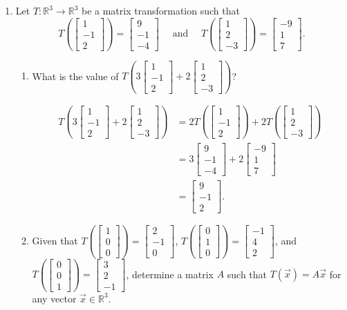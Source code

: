 \documentclass[12pt]{article}
\newcommand{\points}[1]{\marginpar{\hspace{24pt}[#1]}}
\newcommand{\R}{\mathbb{R}}
\newcommand{\bbm}{\begin{bmatrix}}
\newcommand{\ebm}{\end{bmatrix}}
\begin{document}
\begin{enumerate}
\item Let $T:\R^3\to \R^3$ be a matrix transformation such that
 \[T\left(\bbm 1\\-1\\2\ebm\right) = \bbm 9\\-1\\-4\ebm \quad \text{ and } \quad T\left(\bbm 1\\2\\-3\ebm\right) = \bbm -9\\1\\7\ebm.\]
\begin{enumerate}
 \item What is the value of $T\left(3\bbm 1\\-1\\2\ebm+2\bbm 1\\2\\-3\ebm\right)$? \points{3}

\bigskip

\begin{align*}
 T\left(3\bbm 1\\-1\\2\ebm+2\bbm 1\\2\\-3\ebm\right)& = 2T\left(\bbm 1\\-1\\2\ebm\right)+2T\left(\bbm 1\\2\\-3\ebm\right)\\
 & = 3\bbm 9\\-1\\-4\ebm+2\bbm-9\\1\\7\ebm\\
 & = \bbm 9\\-1\\2\ebm.
\end{align*}

\bigskip

 \item Given that $T\left(\bbm 1\\0\\0\ebm\right) = \bbm 2\\-1\\0\ebm$, $T\left(\bbm 0\\1\\0\ebm\right) = \bbm -1\\4\\2\ebm$, and $T\left(\bbm 0\\0\\1\ebm\right) = \bbm 3\\2\\-1\ebm$, determine a matrix $A$ such that $T(\vec{x}) = A\vec{x}$ for any vector $\vec{x}\in\R^3$. \points{2}


\end{enumerate}
\end{enumerate}
\end{document}
